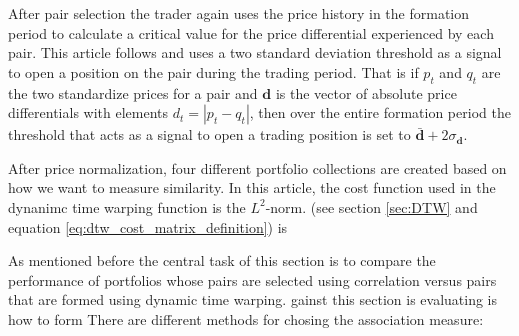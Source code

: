 \documentclass[12pt]{article}
\begin{document}
After pair selection the trader again uses the price history in the formation period to calculate a critical value for the price differential experienced by each pair. This article follows \cite{Gatev_et_al_2006} and uses a two standard deviation threshold as a signal to open a position on the pair during the trading period. That is if $p_{t}$ and $q_{t}$ are the two standardize prices for a pair and $\boldsymbol{d}$ is the vector of absolute price differentials with elements $d_{t} = |p_{t} - q_{t}|$, then over the entire formation period the threshold that acts as a signal to open a trading position is set to $\boldsymbol{\bar{d}} + 2 \sigma_{\boldsymbol{d}}$.

After price normalization, four different portfolio collections are created based on how we want to measure similarity. In this article, the cost function used in the dynanimc time warping function is the $L^{2}$-norm. (see section \ref{sec:DTW} and equation \ref{eq:dtw_cost_matrix_definition}) is 


As mentioned before the central task of this section is to compare the performance of portfolios whose pairs are selected using correlation versus pairs that are formed using dynamic time warping. gainst  this section is evaluating is how to form There are different methods for chosing the association measure:
\end{document}
